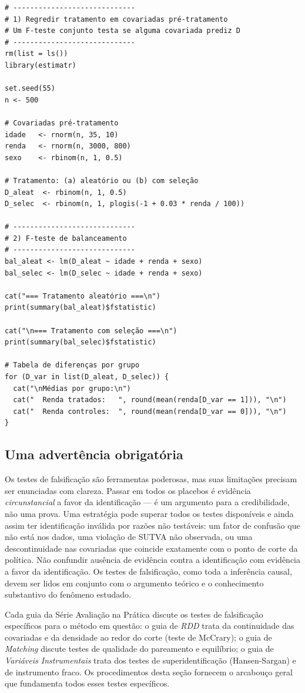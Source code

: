 \begin{lstlisting}[style=Rstyle, caption={Teste de balanceamento via regressão}]
# -----------------------------
# 1) Regredir tratamento em covariadas pré-tratamento
# Um F-teste conjunto testa se alguma covariada prediz D
# -----------------------------
rm(list = ls())
library(estimatr)

set.seed(55)
n <- 500

# Covariadas pré-tratamento
idade   <- rnorm(n, 35, 10)
renda   <- rnorm(n, 3000, 800)
sexo    <- rbinom(n, 1, 0.5)

# Tratamento: (a) aleatório ou (b) com seleção
D_aleat  <- rbinom(n, 1, 0.5)
D_selec  <- rbinom(n, 1, plogis(-1 + 0.03 * renda / 100))

# -----------------------------
# 2) F-teste de balanceamento
# -----------------------------
bal_aleat <- lm(D_aleat ~ idade + renda + sexo)
bal_selec <- lm(D_selec ~ idade + renda + sexo)

cat("=== Tratamento aleatório ===\n")
print(summary(bal_aleat)$fstatistic)

cat("\n=== Tratamento com seleção ===\n")
print(summary(bal_selec)$fstatistic)

# Tabela de diferenças por grupo
for (D_var in list(D_aleat, D_selec)) {
  cat("\nMédias por grupo:\n")
  cat("  Renda tratados:   ", round(mean(renda[D_var == 1])), "\n")
  cat("  Renda controles:  ", round(mean(renda[D_var == 0])), "\n")
}
\end{lstlisting}

\subsection*{Uma advertência obrigatória}

Os testes de falsificação são ferramentas poderosas, mas suas limitações precisam ser enunciadas com clareza. Passar em todos os placebos é evidência \textit{circunstancial} a favor da identificação — é um argumento para a credibilidade, não uma prova. Uma estratégia pode superar todos os testes disponíveis e ainda assim ter identificação inválida por razões não testáveis: um fator de confusão que não está nos dados, uma violação de SUTVA não observada, ou uma descontinuidade nas covariadas que coincide exatamente com o ponto de corte da política. Não confundir ausência de evidência contra a identificação com evidência a favor da identificação. Os testes de falsificação, como toda a inferência causal, devem ser lidos em conjunto com o argumento teórico e o conhecimento substantivo do fenômeno estudado.

\begin{conexaobox}
Cada guia da Série Avaliação na Prática discute os testes de falsificação específicos para o método em questão: o guia de \textit{RDD} trata da continuidade das covariadas e da densidade ao redor do corte (teste de McCrary); o guia de \textit{Matching} discute testes de qualidade do pareamento e equilíbrio; o guia de \textit{Variáveis Instrumentais} trata dos testes de superidentificação (Hansen-Sargan) e de instrumento fraco. Os procedimentos desta seção fornecem o arcabouço geral que fundamenta todos esses testes específicos.
\end{conexaobox}